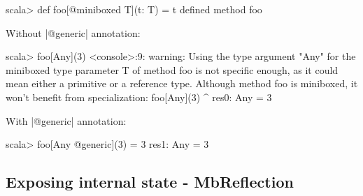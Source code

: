 \begin{lstlisting-nobreak}
scala> def foo[@miniboxed T](t: T) = t
defined method foo
\end{lstlisting-nobreak}
Without |@generic| annotation: 

\begin{lstlisting-nobreak}
scala> foo[Any](3)
<console>:9: warning: Using the type argument "Any" for the miniboxed type parameter T of method foo is not specific enough, as it could mean either a primitive or a reference type. Although method foo is miniboxed, it won't benefit from specialization:
              foo[Any](3)
                 ^
res0: Any = 3
\end{lstlisting-nobreak}
With |@generic| annotation: 

\begin{lstlisting-nobreak}
scala> foo[Any @generic](3) = 3
res1: Any = 3
\end{lstlisting-nobreak}

\subsection{Exposing internal state - MbReflection}

